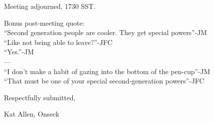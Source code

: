 \documentclass[10pt]{article}
\begin{document}
\vspace{12pt}

\noindent
Meeting adjourned, 1730 SST.

\vspace{18pt}

Bonus post-meeting quote:\\
``Second generation people are cooler. They get special powers''-JM\\
``Like not being able to leave?''-JFC\\
``Yes.''-JM\\
---\\
``I don't make a habit of gazing into the bottom of the pen-cup''-JM\\
``That must be one of your special second-generation powers''-JFC\\

\centerline{Respectfully submitted,}
\centerline{Kat Allen,  Onseck}
\end{document}
